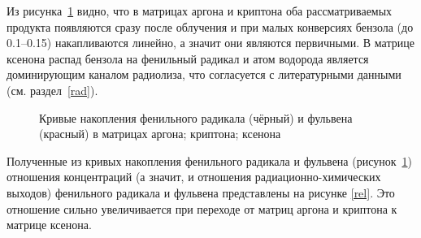 {Из рисунка~\ref{tio} видно, что в матрицах аргона и криптона оба рассматриваемых продукта появляются сразу после облучения и при малых конверсиях бензола (до 0.1--0.15) накапливаются линейно, а значит они являются первичными.
В матрице ксенона распад бензола на фенильный радикал и атом водорода является доминирующим каналом радиолиза, 
что согласуется с литературными данными (см. раздел~\ref{rad}).
\\
\begin{figure}[H]  
\vspace{-4ex} \centering {}  
\hspace{4ex}
\hspace{4ex}
\caption{Кривые накопления фенильного радикала (чёрный) и фульвена (красный) в матрицах  аргона;  криптона;  ксенона} \label{tio}
\end{figure}
\newpage
Полученные из кривых накопления фенильного радикала и фульвена (рисунок~\ref{tio}) отношения концентраций (а значит, и отношения радиационно-химических выходов) фенильного радикала и фульвена представлены на рисунке \ref{rel}.  Это отношение сильно увеличивается при переходе от матриц аргона и криптона к матрице ксенона.
 
}
